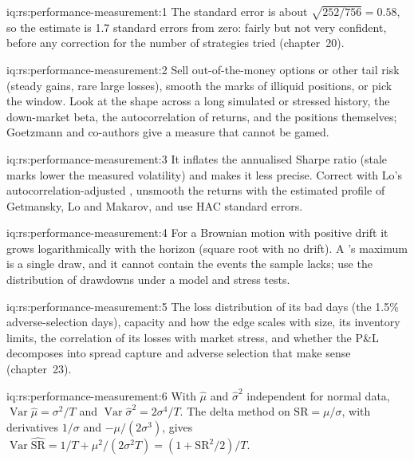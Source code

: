 \begin{solution}{iq:rs:performance-measurement:1}
The standard error is about $\sqrt{252/756} = 0.58$, so the estimate is 1.7 standard errors from zero: fairly but not very confident, before any correction
for the number of strategies tried (chapter~20).
\end{solution}

\begin{solution}{iq:rs:performance-measurement:2}
Sell out-of-the-money options or other tail risk (steady gains, rare large losses), smooth the marks of illiquid positions, or pick the window. Look at the
shape across a long simulated or stressed history, the down-market beta, the autocorrelation of returns, and the positions themselves; Goetzmann and co-authors
give a measure that cannot be gamed.
\end{solution}

\begin{solution}{iq:rs:performance-measurement:3}
It inflates the annualised Sharpe ratio (stale marks lower the measured volatility) and makes it less precise. Correct with Lo's autocorrelation-adjusted
, unsmooth the returns with the estimated profile of Getmansky, Lo and Makarov, and use HAC standard errors.
\end{solution}

\begin{solution}{iq:rs:performance-measurement:4}
For a Brownian motion with positive drift it grows logarithmically with the horizon (square root with no drift). A 's maximum is a single draw, and
it cannot contain the events the sample lacks; use the distribution of drawdowns under a model and stress tests.
\end{solution}

\begin{solution}{iq:rs:performance-measurement:5}
The loss distribution of its bad days (the 1.5\% adverse-selection days), capacity and how the edge scales with size, its inventory limits, the correlation of its
losses with market stress, and whether the P\&L decomposes into spread capture and adverse selection that make sense (chapter~23).
\end{solution}

\begin{solution}{iq:rs:performance-measurement:6}
With $\hat\mu$ and $\hat\sigma^2$ independent for normal data, $\operatorname{Var}\hat\mu = \sigma^2/T$ and $\operatorname{Var}\hat\sigma^2 = 2\sigma^4/T$. The delta
method on $\mathrm{SR} = \mu/\sigma$, with derivatives $1/\sigma$ and $-\mu/(2\sigma^3)$, gives $\operatorname{Var}\widehat{\mathrm{SR}} = 1/T + \mu^2/(2\sigma^2 T) =
(1 + \mathrm{SR}^2/2)/T$.
\end{solution}
